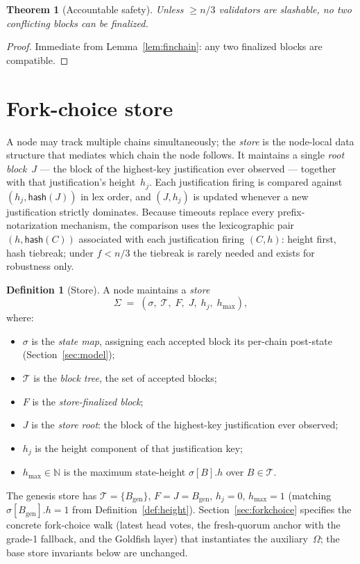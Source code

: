 \ifx\litemode\undefined\documentclass{article}\fi
\newcommand{\genesis}{\ensuremath{B_{\mathrm{gen}}}}
\newcommand{\T}[0]{\ensuremath{\mathcal{T}}}
\newcommand{\hash}{\mathsf{hash}}
\newcommand{\hmax}{\ensuremath{h_{\max}}\xspace}
\theoremstyle{plain}
\newtheorem{theorem}{Theorem}
\theoremstyle{definition}
\newtheorem{definition}{Definition}
\theoremstyle{remark}
\begin{document}
\begin{theorem}[Accountable safety]\label{thm:safety}
Unless $\geq n/3$ validators are slashable, no two conflicting blocks can be finalized.
\end{theorem}

\begin{proof}
Immediate from Lemma~\ref{lem:finchain}: any two finalized blocks are compatible.
\end{proof}
\section{Fork-choice store}\label{sec:store}

A node may track multiple chains simultaneously; the \emph{store} is the node-local data structure that mediates which chain the node follows.
It maintains a single \emph{root block}~$J$ --- the block of the highest-key justification ever observed --- together with that justification's height~$h_j$.
Each justification firing is compared against $(h_j, \hash(J))$ in lex order, and $(J, h_j)$ is updated whenever a new justification strictly dominates.
Because timeouts replace every prefix-notarization mechanism, the comparison uses the lexicographic pair $(h, \hash(C))$ associated with each justification firing $(C, h)$: height first, hash tiebreak; under $f < n/3$ the tiebreak is rarely needed and exists for robustness only.

\begin{definition}[Store]\label{def:store}
A node maintains a \emph{store}
\[
  \Sigma \;=\; (\sigma,\; \T,\; F,\; J,\; h_j,\; \hmax),
\]
where:
\begin{itemize}
  \item $\sigma$ is the \emph{state map}, assigning each accepted block its per-chain post-state (Section~\ref{sec:model});
  \item $\T$ is the \emph{block tree}, the set of accepted blocks;
  \item $F$ is the \emph{store-finalized block};
  \item $J$ is the \emph{store root}: the block of the highest-key justification ever observed;
  \item $h_j$ is the height component of that justification key;
  \item $\hmax \in \mathbb{N}$ is the maximum state-height $\sigma[B].h$ over $B \in \T$.
\end{itemize}
The genesis store has $\T = \{\genesis\}$, $F = J = \genesis$, $h_j = 0$, $\hmax = 1$ (matching $\sigma[\genesis].h = 1$ from Definition~\ref{def:height}).
Section~\ref{sec:forkchoice} specifies the concrete fork-choice walk (latest head votes, the fresh-quorum anchor with the grade-1 fallback, and the Goldfish layer) that instantiates the auxiliary~\(\Omega\); the base store invariants below are unchanged.
\end{definition}
\end{document}

